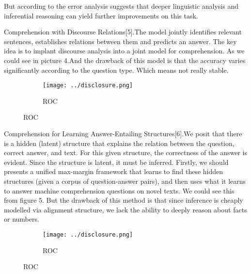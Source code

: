 \documentclass[runningheads,a4paper]{llncs}
\begin{document}
But according to the error analysis suggests that deeper linguistic analysis and inferential reasoning can yield further improvements on this task.


Comprehension with Discourse Relations[5].The model jointly identifies relevant sentences, establishes relations between them and predicts an answer. The key idea is to implant discourse analysis into a joint model for comprehension. As we could see in picture 4.And the drawback of this model is that the accuracy varies significantly according to the question type. Which means not really stable. 
\begin{figure}[p]
	\centering
	\begin{subfigure}{.5\textwidth}
		\centering
		\texttt{[image: ../disclosure.png]}
		\caption{ROC}
		\label{figure 4:disclosure method}
	\end{subfigure}
	
\end{figure}

Comprehension for Learning Answer-Entailing Structures[6].We posit that there is a hidden (latent) structure that explains the relation between the question, correct answer, and text. For this given structure, the correctness of the answer is evident. Since the structure is latent, it must be inferred. Firstly, we should presents a unified max-margin framework that learns to find these hidden structures (given a corpus of question-answer pairs), and then uses what it learns to answer machine comprehension questions on novel texts. We could see this from figure 5. But the drawback of this method is that since inference is cheaply modelled via alignment structure, we lack the ability to deeply reason about facts or numbers. 
\begin{figure}[p]
	\centering
	\begin{subfigure}{.5\textwidth}
		\centering
		\texttt{[image: ../disclosure.png]}
		\caption{ROC}
		\label{figure 5:answer entailing method}
	\end{subfigure}
	
\end{figure}
\end{document}
